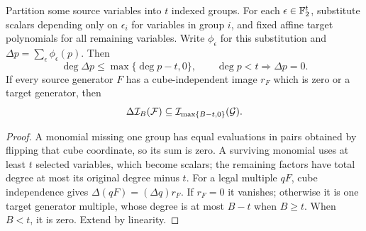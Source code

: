 \begin{lemma}\label{lem:cube-drop}
Partition some source variables into \(t\) indexed groups. For each
\(\epsilon\in\mathbb F_2^t\), substitute scalars depending only on \(\epsilon_i\)
for variables in group \(i\), and fixed affine target polynomials for
all remaining variables. Write \(\phi_\epsilon\) for this substitution
and \(\Delta p=\sum_\epsilon\phi_\epsilon(p)\). Then
\[
 \deg\Delta p\le\max\{\deg p-t,0\},\qquad
 \deg p<t\Longrightarrow\Delta p=0.
\]
If every source generator \(F\) has a cube-independent image \(r_F\)
which is zero or a target generator, then
\[
 \Delta\mathcal I_B(\mathcal F)\subseteq
       \mathcal I_{\max\{B-t,0\}}(\mathcal G).
\]
\end{lemma}
\begin{proof}
A monomial missing one group has equal evaluations in pairs obtained by
flipping that cube coordinate, so its sum is zero. A surviving monomial
uses at least \(t\) selected variables, which become scalars; the remaining
factors have total degree at most its original degree minus \(t\).
For a legal multiple \(qF\), cube independence gives
\(\Delta(qF)=(\Delta q)r_F\). If \(r_F=0\) it vanishes; otherwise it is
one target generator multiple, whose degree is at most \(B-t\) when
\(B\ge t\). When \(B<t\), it is zero. Extend by linearity.
\end{proof}

